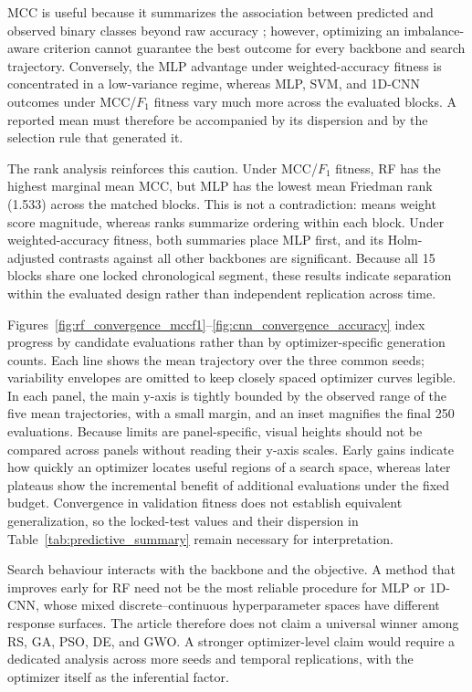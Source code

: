 MCC is useful because it summarizes the association between predicted and observed binary classes beyond raw accuracy \cite{chicco2020mcc}; however, optimizing an imbalance-aware criterion cannot guarantee the best outcome for every backbone and search trajectory. Conversely, the MLP advantage under weighted-accuracy fitness is concentrated in a low-variance regime, whereas MLP, SVM, and 1D-CNN outcomes under MCC/$F_1$ fitness vary much more across the evaluated blocks. A reported mean must therefore be accompanied by its dispersion and by the selection rule that generated it.

The rank analysis reinforces this caution. Under MCC/$F_1$ fitness, RF has the highest marginal mean MCC, but MLP has the lowest mean Friedman rank (1.533) across the matched blocks. This is not a contradiction: means weight score magnitude, whereas ranks summarize ordering within each block. Under weighted-accuracy fitness, both summaries place MLP first, and its Holm-adjusted contrasts against all other backbones are significant. Because all 15 blocks share one locked chronological segment, these results indicate separation within the evaluated design rather than independent replication across time.


Figures~\ref{fig:rf_convergence_mccf1}--\ref{fig:cnn_convergence_accuracy} index progress by candidate evaluations rather than by optimizer-specific generation counts. Each line shows the mean trajectory over the three common seeds; variability envelopes are omitted to keep closely spaced optimizer curves legible. In each panel, the main y-axis is tightly bounded by the observed range of the five mean trajectories, with a small margin, and an inset magnifies the final 250 evaluations. Because limits are panel-specific, visual heights should not be compared across panels without reading their y-axis scales. Early gains indicate how quickly an optimizer locates useful regions of a search space, whereas later plateaus show the incremental benefit of additional evaluations under the fixed budget. Convergence in validation fitness does not establish equivalent generalization, so the locked-test values and their dispersion in Table~\ref{tab:predictive_summary} remain necessary for interpretation.

Search behaviour interacts with the backbone and the objective. A method that improves early for RF need not be the most reliable procedure for MLP or 1D-CNN, whose mixed discrete--continuous hyperparameter spaces have different response surfaces. The article therefore does not claim a universal winner among RS, GA, PSO, DE, and GWO. A stronger optimizer-level claim would require a dedicated analysis across more seeds and temporal replications, with the optimizer itself as the inferential factor.


